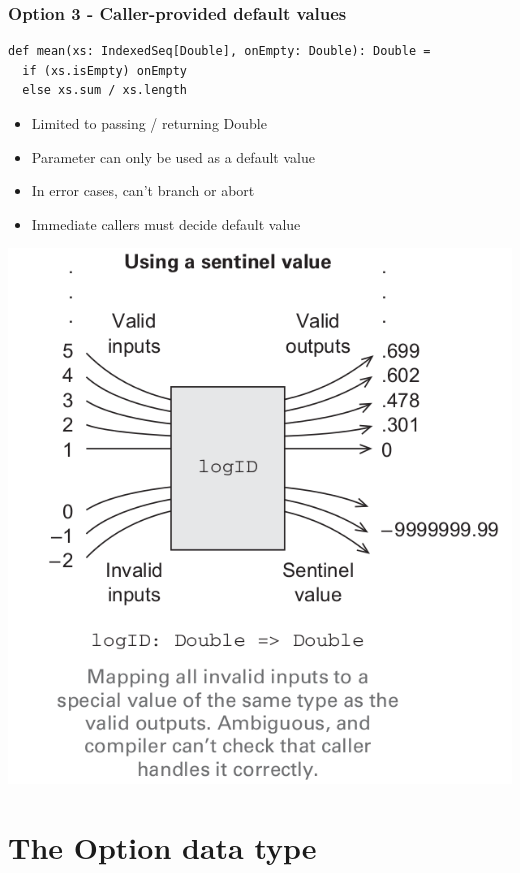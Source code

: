 \documentclass{beamer}
\begin{document}
\begin{frame}[fragile]
  \frametitle{Option 3 - Caller-provided default values}
\begin{lstlisting}
def mean(xs: IndexedSeq[Double], onEmpty: Double): Double =
  if (xs.isEmpty) onEmpty
  else xs.sum / xs.length
\end{lstlisting}
\begin{itemize}
  \item Limited to passing / returning {\ttfamily Double}
  \item Parameter can only be used as a default value
  \item In error cases, can't branch or abort
  \item Immediate callers must decide default value
\end{itemize}
\begin{center}
\includegraphics[scale=.15]{map-sentinel.png}
\end{center}
\end{frame}

\section{The Option data type}
\end{document}
